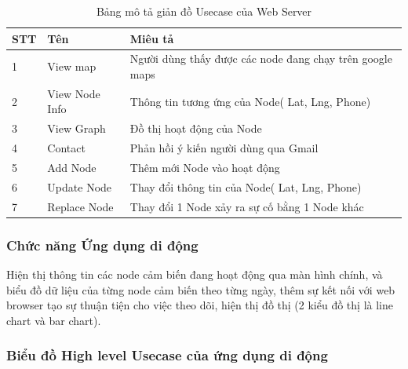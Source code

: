 \begin{table}[H]
\centering
\caption{Bảng mô tả giản đồ Usecase của Web Server}
\label{table:usewebsite}
\begin{tabular}{|l|l|l|}
\hline
STT & Tên            & Miêu tả                                                                                            \\ \hline
1   & View map       & Người dùng thấy được các node đang chạy trên google maps                                           \\ \hline
2   & View Node Info & Thông tin tương ứng của Node( Lat, Lng, Phone)                                                     \\ \hline
3   & View Graph     & Đồ thị hoạt động của Node
\\ \hline
4   & Contact        & Phản hồi ý kiến người dùng qua Gmail                                                               \\ \hline
5   & Add Node       & Thêm mới Node vào hoạt động                                                                        \\ \hline
6   & Update Node    & Thay đổi thông tin của Node( Lat, Lng, Phone)                                                      \\ \hline
7   & Replace Node   & Thay đổi 1 Node xảy ra sự cố bằng 1 Node khác                                                      \\ \hline
\end{tabular}
\end{table}








\subsubsection*{Chức năng Ứng dụng di động}
Hiện thị thông tin các node cảm biến đang hoạt động qua màn hình chính, và biểu đồ dữ liệu của từng node cảm biến theo từng ngày, thêm sự kết nối với web browser tạo sự thuận tiện cho việc theo dõi, hiện thị đồ thị (2 kiểu đồ thị là line chart và bar chart).
\subsubsection*{Biểu đồ High level Usecase của ứng dụng di động}

